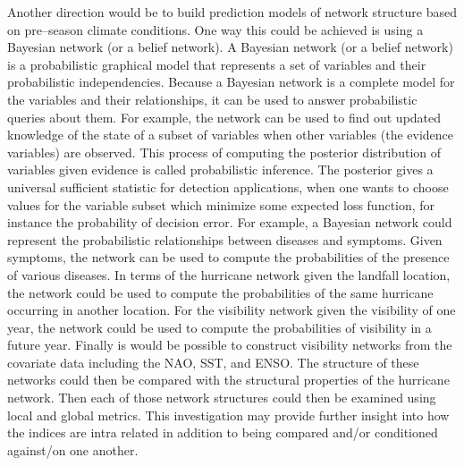 Another direction would be to build prediction models of network structure based on pre–season climate conditions. One way this could be achieved is using a Bayesian network (or a belief network). A Bayesian network (or a belief network) is a probabilistic graphical model that represents a set of variables and their probabilistic independencies. Because a Bayesian network is a complete model for the variables and their relationships, it can be used to answer probabilistic queries about them. For example, the network can be used to find out updated knowledge of the state of a subset of variables when other variables (the evidence variables) are observed. This process of computing the posterior distribution of variables given evidence is called probabilistic inference. The posterior gives a universal sufficient statistic for detection applications, when one wants to choose values for the variable subset which minimize some expected loss function, for instance the probability of decision error. For example, a Bayesian network could represent the probabilistic relationships between diseases and symptoms. Given symptoms, the network can be used to compute the probabilities of the presence of various diseases. In terms of the hurricane network given the landfall location, the network could be used to compute the probabilities of the same hurricane occurring in another location. For the visibility network given the visibility of one year, the network could be used to compute the probabilities of visibility in a future year.
Finally is would be possible to construct visibility networks from the covariate data including the NAO, SST, and ENSO. The structure of these networks could then be compared with the structural properties of the hurricane network. Then each of those network structures could then be examined using local and global metrics. This investigation may provide further insight into how the indices are intra related in addition to being compared and/or conditioned against/on one another.